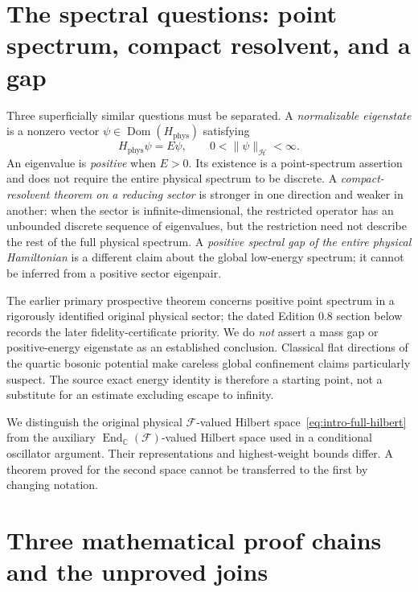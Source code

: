\section{The spectral questions: point spectrum, compact resolvent, and a gap}

Three superficially similar questions must be separated. A
\emph{normalizable eigenstate} is a nonzero vector
$\psi\in\operatorname{Dom}(H_{\mathrm{phys}})$ satisfying
\begin{equation}\label{eq:intro-eigenvalue}
 H_{\mathrm{phys}}\psi=E\psi,\qquad
 0<\|\psi\|_{\mathscr H}<\infty.
\end{equation}
An eigenvalue is \emph{positive} when $E>0$. Its existence is a
point-spectrum assertion and does not require the entire physical
spectrum to be discrete. A \emph{compact-resolvent theorem on a
reducing sector} is stronger in one direction and weaker in another:
when the sector is infinite-dimensional, the restricted operator has
an unbounded discrete sequence of eigenvalues, but the restriction
need not describe the rest of the full physical spectrum. A
\emph{positive spectral gap of the entire physical Hamiltonian} is
a different claim about the global low-energy spectrum; it cannot be
inferred from a positive sector eigenpair.

The earlier primary prospective theorem concerns positive point spectrum in
a rigorously identified original physical sector; the dated Edition 0.8
section below records the later fidelity-certificate priority. We do \emph{not}
assert a mass gap or positive-energy eigenstate as an established
conclusion. Classical flat directions of the quartic bosonic potential
make careless global confinement claims particularly suspect. The
source exact energy identity is therefore a starting point, not a
substitute for an estimate excluding escape to infinity.

\begin{remark}
We distinguish the original physical $\mathcal F$-valued Hilbert
space~\eqref{eq:intro-full-hilbert} from the auxiliary
$\operatorname{End}_{\mathbb C}(\mathcal F)$-valued Hilbert space used
in a conditional oscillator argument. Their representations and
highest-weight bounds differ. A theorem proved for the second space
cannot be transferred to the first by changing notation.
\end{remark}

\section{Three mathematical proof chains and the unproved joins}

